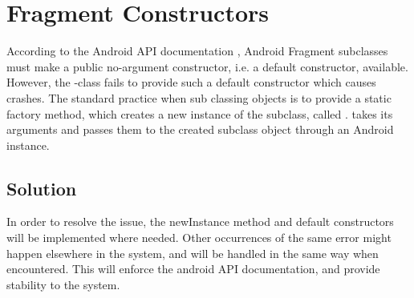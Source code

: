 
\section{Fragment Constructors}
\label{sec:fragment_constructors}

According to the Android API documentation \parencite{android_dev_fragment}, Android Fragment subclasses must make a public no-argument constructor, i.e. a default constructor, available. However, the \giraf-class  fails to provide such a default constructor which causes crashes. The standard practice when sub classing  objects is to provide a static factory method, which creates a new instance of the  subclass, called .  takes its arguments and passes them to the created  subclass object through an Android  instance. 

\subsection{Solution} 
\label{sub:fragment_constructors_solution}
In order to resolve the issue, the newInstance method and default constructors will be implemented where needed. Other occurrences of the same error might happen elsewhere in the system, and will be handled in the same way when encountered. This will enforce the android API documentation, and provide stability to the system. 